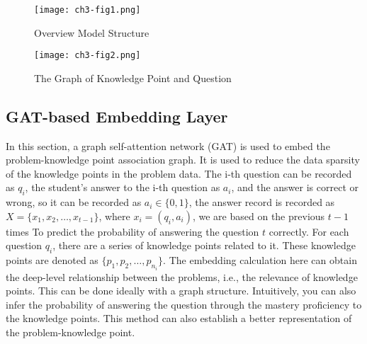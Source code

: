 \begin{figure}[h]
	\centering
	\texttt{[image: ch3-fig1.png]}
	\caption{Overview Model Structure}\label{fig:ch3-fig1}
\end{figure}
\begin{figure}[h]
	\centering
	\texttt{[image: ch3-fig2.png]}
	\caption{The Graph of Knowledge Point and Question}\label{fig:ch3-fig2}
\end{figure}


\subsection{GAT-based Embedding Layer}

In this section, a graph self-attention network (GAT) is used to embed the problem-knowledge point association graph. It is used to reduce the data sparsity of the knowledge points in the problem data. The i-th question can be recorded as \(q_i\), the student's answer to the i-th question as \(a_i\), and the answer is correct or wrong, so it can be recorded as \(a_i\in \{0,1\} \), the answer record is recorded as \(X=\{x_1,x_2,\ldots,x_{t-1}\} \), where \(x_i=(q_i,a_i)\), we are based on the previous \(t-1\) times To predict the probability of answering the question \(t\) correctly. For each question \(q_i\), there are a series of knowledge points related to it. These knowledge points are denoted as \( \{p_1,p_2,\ldots,p_{n_i}\} \). The embedding calculation here can obtain the deep-level relationship between the problems, i.e., the relevance of knowledge points. This can be done ideally with a graph structure. Intuitively, you can also infer the probability of answering the question through the mastery proficiency to the knowledge points. This method can also establish a better representation of the problem-knowledge point.

